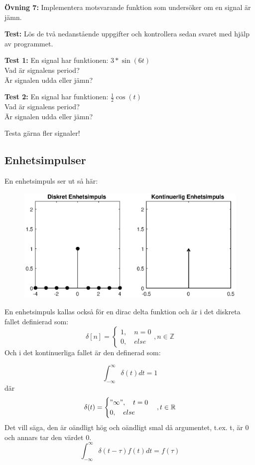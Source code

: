 \documentclass{article}
\begin{document}
\textbf{Övning 7:} Implementera motsvarande funktion som undersöker om en signal är jämn.

\textbf{Test:} Lös de två nedanstående uppgifter och kontrollera sedan svaret med hjälp av programmet.

\textbf{Test 1:}
En signal har funktionen: $3*\sin(6t)$\\
Vad är signalens period?\\
Är signalen udda eller jämn?

\textbf{Test 2:}
En signal har funktionen: $\frac{1}{2} \cos(t)$\\
Vad är signalens period?\\
Är signalen udda eller jämn?

Testa gärna fler signaler!

\subsection{Enhetsimpulser}
En enhetsimpuls ser ut så här:


\begin{figure}[ht]
\centerline{\includegraphics[scale=0.50]{delta.eps}}

\caption{}
\label{}
\end{figure}

En enhetsimpuls kallas också för en dirac delta funktion och är i det diskreta fallet definierad som:
$$
\delta[n]=
\begin{cases}
    1,\quad n = 0 \\
    0, \quad else
\end{cases}, n \in \mathbb{Z}
$$
Och i det kontinuerliga fallet är den definerad som:

$$\int_{-\infty}^{\infty} \delta(t) dt = 1 $$
där
$$
\delta(t)=
\begin{cases}
"\infty",\quad t = 0 \\
0, \quad else
\end{cases}, t\in \mathbb{R}
$$
Det vill säga, den är oändligt hög och oändligt smal då argumentet, t.ex. t, är 0 och annars tar den värdet 0.
$$\int_{-\infty}^{\infty} \delta(t-\tau) f(t) dt = f(\tau) $$
\end{document}
